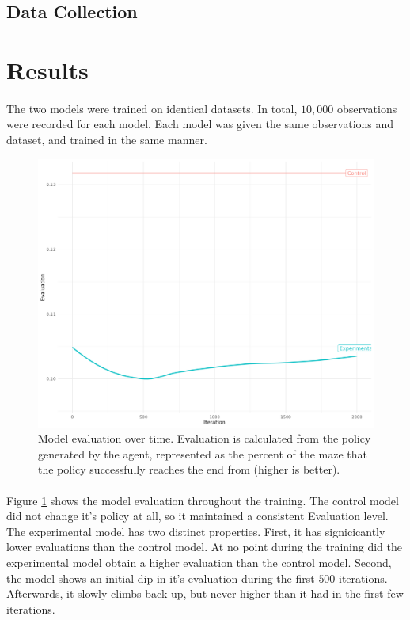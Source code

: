 \documentclass[12pt]{article}
\begin{document}
\subsection{Data Collection}


\section{Results}

\paragraph{} 
The two models were trained on identical datasets.
In total, $10,000$ observations were recorded for each model. 
Each model was given the same observations and dataset, and trained in the same manner.

\begin{figure}[h]
    \includegraphics[width=\linewidth]{graph.png}
    \caption{Model evaluation over time. Evaluation is calculated from the policy generated by the agent, represented as the percent of the maze that the policy successfully reaches the end from (higher is better).}
		\label{fig:graphs}
\end{figure}

\paragraph{}
Figure \ref{fig:graphs} shows the model evaluation throughout the training.
The control model did not change it's policy at all, so it maintained a consistent Evaluation level.
The experimental model has two distinct properties.
First, it has signicicantly lower evaluations than the control model.
At no point during the training did the experimental model obtain a higher evaluation than the control model.
Second, the model shows an initial dip in it's evaluation during the first $500$ iterations.
Afterwards, it slowly climbs back up, but never higher than it had in the first few iterations.




\newpage


\end{document}
